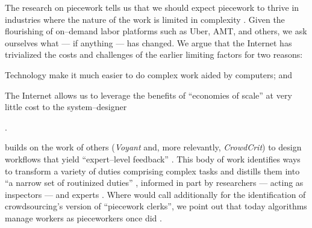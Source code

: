 \documentclass[trackingWork]{subfiles}
\begin{document}
\subsubsubsection{\whatchanged}
The research on piecework tells us that
we should expect piecework to thrive in industries where
the nature of the work is limited in complexity
\cite{Brown01041990} .
Given the flourishing of on--demand labor platforms such as
Uber, AMT, and others, we ask ourselves
what --- if anything --- has changed.
We argue that
the Internet has trivialized
the costs and challenges of the earlier limiting factors for two reasons:
\begin{inlinelist}
  \item Technology make it much easier to do complex work aided by computers; and %
  \item The Internet allows us to leverage the benefits of
        ``economies of scale'' at very little cost
        to the system--designer \cite{lessig2006code,miller2011understanding} 
\end{inlinelist}.

\citeauthor{yuanAlmost} builds on the work of others
(\textit{Voyant} and, more relevantly, \textit{CrowdCrit})
to design workflows that yield ``expert--level feedback''
\cite{yuanAlmost,Xu:2014:VGS:2531602.2531604,Luther:2014:CCA:2556420.2556788}.
This body of work identifies ways to transform a variety of duties comprising complex tasks
and distills them into ``a narrow set of routinized duties''%
, informed in part by researchers --- acting as inspectors --- and experts
\cite[quotations from][]{10.2307/23702539}.
Where \citeauthor{10.2307/23702539} would call additionally for the identification of
crowdsourcing's version of ``piecework clerks'', we point out that
today algorithms manage workers as pieceworkers once did
\cite{uberAlgorithm,10.2307/23702539}.
\end{document}
